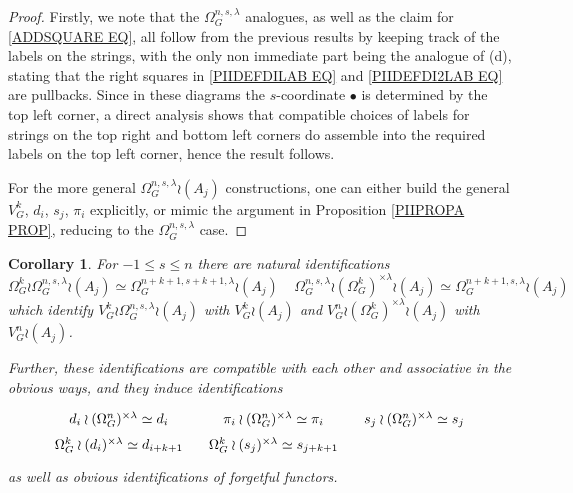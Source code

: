 \documentclass[a4paper,10pt
,draft
]{article}%
\numberwithin{equation}{section}
\numberwithin{figure}{section}
\newtheorem{corollary}[equation]{Corollary}%
\theoremstyle{definition} %
\newcommand{\1}{\ensuremath{\mathbbm 1}}%
\begin{document}
\begin{proof}
	Firstly, we note that the $\Omega_{G}^{n,s,\lambda}$
	analogues, as well as the claim for \eqref{ADDSQUARE EQ}, all follow from the previous results
	by keeping track of the labels on the strings, 
	with the only non immediate part
	being the analogue of (d), stating that the right squares in 
	\eqref{PIIDEFDILAB EQ} and
	\eqref{PIIDEFDI2LAB EQ} are pullbacks. Since in these diagrams the $s$-coordinate $\bullet$ is determined by the top left corner, a direct analysis shows that compatible choices of labels for strings on the top right and bottom left corners do assemble into the required labels on the top left corner, hence the result follows.
		
	For the more general $\Omega_{G}^{n,s,\lambda} \wr (A_j)$ constructions, one can either build the
	general $V_G^k$, $d_i$, $s_j$, $\pi_i$ 
	explicitly, or mimic the argument in Proposition \ref{PIIPROPA PROP}, reducing to the 
	$\Omega_{G}^{n,s,\lambda}$ case.
\end{proof}

\begin{corollary}\label{LABIDEN COR}
For $-1 \leq s \leq n$ there are natural identifications
\begin{equation}\label{MOREIDENT1 EQ}
	\Omega_G^{k} \wr \Omega_G^{n,s,\lambda} \wr (A_j) \simeq
	\Omega_G^{n+k+1,s+k+1,\lambda} \wr (A_j)
 \phantom{||||}
	\Omega_G^{n,s,\lambda} \wr 
	(\Omega_G^k)^{\times \lambda}
	\wr (A_j)
\simeq
	\Omega_G^{n+k+1,s,\lambda} \wr (A_j)
\end{equation}
which identify 
$V^k_G \wr \Omega_G^{n,s,\lambda} \wr (A_j) $ with 
$V^k_G \wr (A_j) $
and 
$V_G^n \wr (\Omega_G^k)^{\times \lambda}\wr (A_j) $
with 
$V_G^n \wr (A_j)$.

Further, these identifications are compatible with each other and associative in the obvious ways, and they induce identifications
\begin{equation}\label{MOREIDENT2 EQ}
\begin{tikzcd}[row sep=0, column sep = 10]
	d_i \wr (\Omega_G^{n})^{\times \lambda} \simeq d_i 
&
	\pi_i \wr (\Omega_G^{n})^{\times \lambda} \simeq \pi_i 
&
	s_j \wr (\Omega_G^{n})^{\times \lambda} \simeq s_j 
\\
	\Omega_G^k \wr (d_i)^{\times \lambda} \simeq d_{i+k+1} 
&
	\Omega_G^k \wr (s_j)^{\times \lambda} \simeq s_{j+k+1}
\end{tikzcd}
\end{equation}
as well as obvious identifications of forgetful functors.
\end{corollary}
\end{document}
